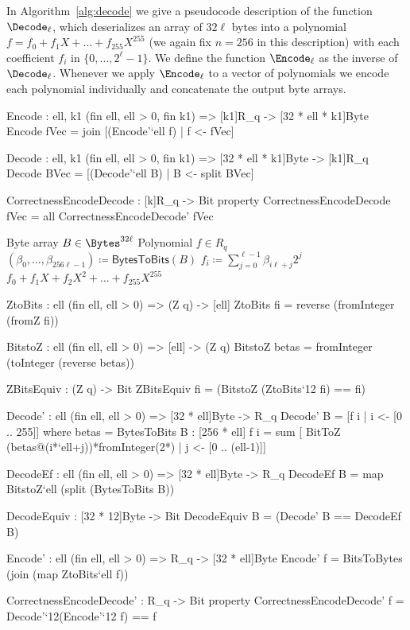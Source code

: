 In Algorithm~\ref{alg:decode} we give a pseudocode description of the
function $\Decode_\ell$, which deserializes an array of $32\ell$ bytes
into a polynomial $f = f_0 + f_1X + \dots + f_{255}X^{255}$ 
(we again fix $n=256$ in this description) with each
coefficient $f_i$ in  $\{0,\dots,2^\ell-1\}$. 
We define the function $\Encode_\ell$ as the inverse of $\Decode_\ell$.
Whenever we apply $\Encode_\ell$ to a vector of polynomials we encode
each polynomial individually and concatenate the output byte arrays.

\begin{code}
  Encode : {ell, k1} (fin ell, ell > 0, fin k1) => [k1]R_q -> [32 * ell * k1]Byte
  Encode fVec = join [(Encode'`{ell} f) | f <- fVec]
  
  Decode : {ell, k1} (fin ell, ell > 0, fin k1) => [32 * ell * k1]Byte -> [k1]R_q
  Decode BVec = [(Decode'`{ell} B) | B <- split BVec]
  
  CorrectnessEncodeDecode : [k]R_q -> Bit
  property CorrectnessEncodeDecode fVec = all CorrectnessEncodeDecode' fVec
\end{code}

\begin{algorithm}
  \caption{$\Decode_\ell\colon\Bytes^{32\ell}\rightarrow R_q$
  }
  \label{alg:decode}
  \begin{algorithmic}
    \Require Byte array $B \in \Bytes^{32\ell}$ 
    \Ensure Polynomial $f \in R_q$
    \State $(\beta_0,\dots,\beta_{256\ell-1}) \coloneqq \mathsf{BytesToBits}(B)$
      \State $f_i \coloneqq \sum_{j=0}^{\ell-1}\beta_{i\ell+j}2^{j}$
    \EndFor
    \State \Return $f_0 + f_1X + f_2X^2 + \dots + f_{255}X^{255}$
  \end{algorithmic}
\end{algorithm}

\begin{code}
  ZtoBits : {ell} (fin ell, ell > 0) => (Z q) -> [ell]
  ZtoBits fi = reverse (fromInteger (fromZ fi))

  BitstoZ : {ell} (fin ell, ell > 0) => [ell] -> (Z q)
  BitstoZ betas = fromInteger (toInteger (reverse betas))

  ZBitsEquiv : (Z q) -> Bit
  ZBitsEquiv fi = (BitstoZ (ZtoBits`{12} fi) == fi)

  Decode' : {ell} (fin ell, ell > 0) => [32 * ell]Byte -> R_q
  Decode' B = [f i | i <- [0 .. 255]]
      where betas = BytesToBits B : [256 * ell]
            f i = sum [ BitToZ (betas@(i*`ell+j))*fromInteger(2^^j)
                      | j <- [0 .. (ell-1)]]

  DecodeEf : {ell} (fin ell, ell > 0) => [32 * ell]Byte -> R_q
  DecodeEf B = map BitstoZ`{ell} (split (BytesToBits B))

  DecodeEquiv : [32 * 12]Byte -> Bit
  DecodeEquiv B = (Decode' B == DecodeEf B)
  
  Encode' : {ell} (fin ell, ell > 0) => R_q -> [32 * ell]Byte
  Encode' f = BitsToBytes (join (map ZtoBits`{ell} f))
  
  CorrectnessEncodeDecode' : R_q -> Bit
  property CorrectnessEncodeDecode' f = Decode'`{12}(Encode'`{12} f) == f
\end{code}

